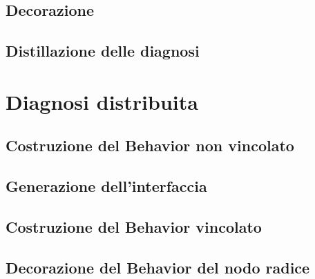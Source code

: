 \subsection{Decorazione}

\subsection{Distillazione delle diagnosi}


\section{Diagnosi distribuita}
\subsection{Costruzione del Behavior non vincolato}

\subsection{Generazione dell'interfaccia}

\subsection{Costruzione del Behavior vincolato}

\subsection{Decorazione del Behavior del nodo radice}